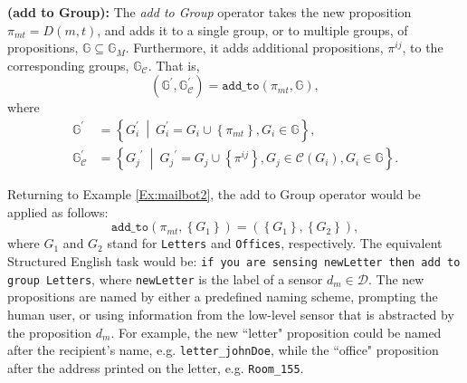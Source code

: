 \begin{myDefinition}\label{Def:addto}
	\textbf{(add to Group):} The \emph{add to Group} operator takes the new proposition $\pi_{mt} = D(m,t)$, and adds it to a single group, or to multiple groups, of propositions, 
	$ \mathbb{G} \subseteq \mathbb{G}_M$.
	Furthermore, it adds additional propositions, $\pi^{ij}$, to the corresponding groups,
	$\mathbb{G}_\mathcal{C}$.
	That is,
	\begin{equation}
		(\mathbb{G}^\prime, \mathbb{G}_{\mathcal{C}}^\prime) = \texttt{add\_to}(\pi_{mt}, \mathbb{G}),
	\end{equation}
	where
	\begin{subequations}
	\begin{align*}
		\mathbb{G}^\prime &= \left\{ G_i^\prime \: \middle| \: G_i^\prime = G_i \cup \left\{ \pi_{mt} \right\}, G_i \in \mathbb{G} \right\},\\
		\mathbb{G}_{\mathcal{C}}^\prime &= \left\{{G_j}^\prime \: \middle| \: {G_j}^\prime = G_j \cup \left\{ \pi^{ij} \right\}, G_j \in \mathcal{C}(G_i), G_i \in \mathbb{G} \right\}.
	\end{align*}
	\end{subequations}
\end{myDefinition}


Returning to Example \ref{Ex:mailbot2}, the add to Group operator would be applied as follows: 
$$ \texttt{add\_to}(\pi_{mt}, \left\{ G_1 \right\}) = ( \left\{ G_1 \right\},  \left\{ G_2 \right\}),$$
where $G_1$ and $G_2$ stand for \texttt{Letters} and \texttt{Offices}, respectively.
The equivalent Structured English task would be: \texttt{if you are sensing newLetter then add to group Letters}, where \texttt{newLetter} is the label of a sensor $d_m \in \mathcal{D}$. The new propositions are named by either a predefined naming scheme, prompting the human user, or using information from the low-level sensor that is abstracted by the proposition $d_m$. For example, the new ``letter" proposition could be named after the recipient's name, e.g. \texttt{letter\_johnDoe}, while the ``office" proposition after the address printed on the letter, e.g. \texttt{Room\_155}.


